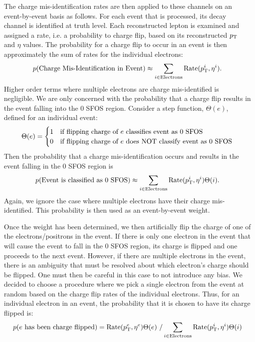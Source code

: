 The charge mis-identification rates are then applied to these channels on an 
event-by-event basis as follows.
For each event that is processed, its decay channel is identified 
at truth level. Each reconstructed lepton
is examined  and assigned a rate, i.e. a probability to charge flip, 
based on its reconstructed $p_{\mathrm{T}}$ and $\eta$ values.
The probability for a charge flip to occur in an event is then approximately 
the sum of rates for the individual electrons:
\begin{equation}
p(\textrm{Charge Mis-Identification in Event}) \approx \sum_{i \in \textrm{Electrons}}  \textrm{Rate}(\pt^i,\eta^i) .
\end{equation}
Higher order terms where multiple electrons are charge mis-identified is negligible.
We are only concerned with the probability that a charge flip results in the 
event falling into the 0 SFOS region. 
Consider a step function, $\Theta(e)$, defined for an individual event:
\[
\Theta(e) = 
\begin{cases}
\hfill 1 \hfill & \text{if flipping charge of $e$ classifies event as 0 SFOS} \\
\hfill 0 \hfill & \text{if flipping charge of $e$ does NOT classify event as 0 SFOS}\\
\end{cases}
\]
Then the probability that a charge mis-identification occurs and results in 
the event falling in the 0 SFOS region is
\begin{equation}
p(\textrm{Event is classified as 0 SFOS}) \approx \sum_{i \in \textrm{Electrons}}  \textrm{Rate}(\pt^i,\eta^i)\Theta(i) .
\end{equation}
Again, we ignore the case where multiple electrons have their charge 
mis-identified.  This probability is then used as an event-by-event weight. 


Once the weight has been determined, we then artificially flip the charge of 
one of the electrons/positrons in the event.
If there is only one electron in the event that will cause the event 
to fall in the 0 SFOS region, its charge is flipped
and one proceeds to the next event.  However, if there are multiple electrons 
in the event, there is an ambiguity that must be resolved
about which electron's charge should be flipped. One must then be careful in 
this case to not introduce any bias.
We decided to choose a procedure where we pick a single electron from the 
event at random based on the charge flip rates
of the individual electrons. Thus, for an individual electron in an 
event, the probability that it is chosen to have its charge
flipped is:
\begin{equation}
p(\textrm{$e$ has been charge flipped}) = \textrm{Rate}(\pt^e,\eta^e)\Theta(e)~/\sum_{i \in \textrm{Electrons}} \textrm{Rate}(\pt^i,\eta^i)\Theta(i)
\end{equation}

